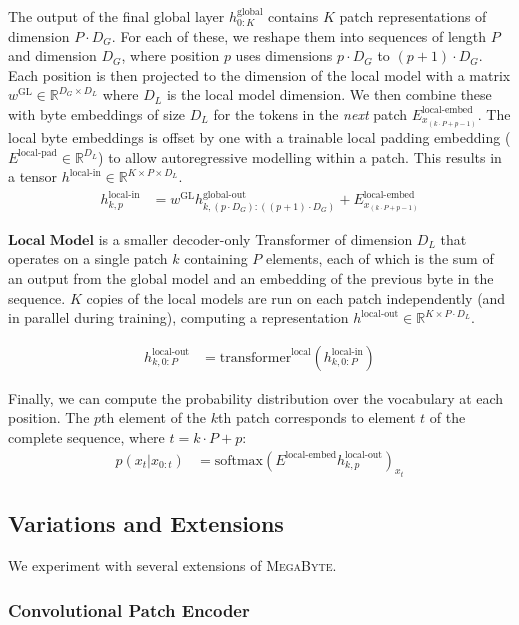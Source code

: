 \documentclass{article}
\newcommand{\fastslow}[0]{\textsc{MegaByte}\xspace}
\newcommand{\megabyte}[0]{\fastslow}
\newcommand{\h}[1]{h^\text{#1}}
\newcommand{\inR}[1]{\in\mathbb{R}^{#1}}
\newcommand{\transformer}[2]{\text{transformer}^{\text{#1}}(#2)}
\theoremstyle{plain}
\theoremstyle{definition}
\theoremstyle{remark}
\begin{document}
The output of the final global layer $\h{global}_{0:K}$ contains $K$ patch representations of dimension $P\cdot D_G$. For each of these, we reshape them into sequences of length $P$ and dimension $D_G$, where position $p$ uses dimensions $p \cdot D_G$ to $(p+1) \cdot D_G$. Each position is then projected to the dimension of the local model with a matrix $w^{\text{GL}}\inR{D_G\times D_L}$ where $D_L$ is the local model dimension.
We then combine these with byte embeddings of size $D_L$ for the tokens in the \emph{next} patch $E^\text{local-embed}_{x_{(k\cdot P + p - 1)}}$. 
The local byte embeddings is offset by one with a trainable local padding embedding ($E^{\text{local-pad}} \inR{D_L}$) to allow autoregressive modelling within a patch. This results in a tensor $\h{local-in}\inR{K\times P \times D_L}$.
\begin{align}
\h{local-in}_{k,p} &= w^{\text{GL}}\h{global-out}_{k,(p\cdot D_G):((p+1)\cdot D_G)} + E^\text{local-embed}_{x_{(k\cdot P + p - 1)}}
\end{align}

$\textbf{Local Model}$  is a smaller decoder-only Transformer of dimension $D_L$ that operates on a single patch $k$ containing $P$ elements, each of which is the sum of an output from the global model and an embedding of the previous byte in the sequence.
$K$ copies of the local models are run on each patch independently (and in parallel during training), computing a representation $\h{local-out}\inR{K\times P\cdot D_L} $.

\begin{align}
\h{local-out}_{k,0:P} &= \transformer{local}{\h{local-in}_{k,0:P}} 
\end{align}

Finally, we can compute the probability distribution over the vocabulary at each position. The $p$th element of the $k$th patch corresponds to element $t$ of the complete sequence, where $t=k\cdot P+p$:
\begin{align}
p(x_{t}|x_{0:t}) &= \text{softmax}{(E^\text{local-embed}\h{local-out}_{k,p})}_{x_t} 
\end{align}

\subsection{Variations and Extensions}
We experiment with several extensions of \megabyte.

\subsubsection{Convolutional Patch Encoder}
\end{document}
